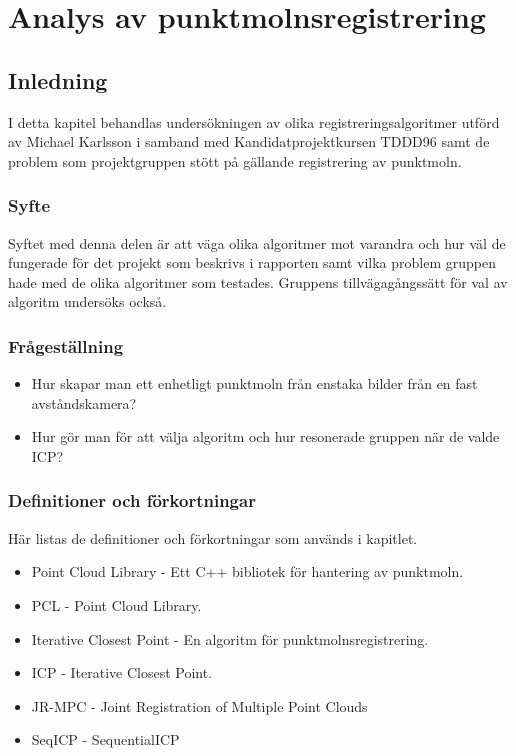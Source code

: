 \chapter{Analys av punktmolnsregistrering}
\label{cha:indiv-report-karlsson}


\section{Inledning}
\label{sec:introduction-karlsson}

I detta kapitel behandlas undersökningen av olika registreringsalgoritmer utförd av Michael Karlsson i samband med Kandidatprojektkursen TDDD96 samt de problem som projektgruppen stött på gällande registrering av punktmoln.

\subsection{Syfte}
\label{sec:purpose-karlsson}

Syftet med denna delen är att väga olika algoritmer mot varandra och hur väl de fungerade för det projekt som beskrivs i rapporten samt vilka problem gruppen hade med de olika algoritmer som testades. Gruppens tillvägagångssätt för val av algoritm undersöks också.


\subsection{Frågeställning}
\label{sec:issue-karlsson}

\begin{itemize}
	\item Hur skapar man ett enhetligt punktmoln från enstaka bilder från en fast \newline avståndskamera?
	\item Hur gör man för att välja algoritm och hur resonerade gruppen när de valde ICP?	
\end{itemize}

\subsection{Definitioner och förkortningar}
\label{sec:definitions-acronyms-karlsson}

Här listas de definitioner och förkortningar som används i kapitlet.

\begin{itemize}
	\item Point Cloud Library - Ett C++ bibliotek för hantering av punktmoln.
	\item PCL - Point Cloud Library.
	\item Iterative Closest Point - En algoritm för punktmolnsregistrering.
	\item ICP - Iterative Closest Point.
	\item JR-MPC - Joint Registration of Multiple Point Clouds
	\item SeqICP - SequentialICP
\end{itemize}


